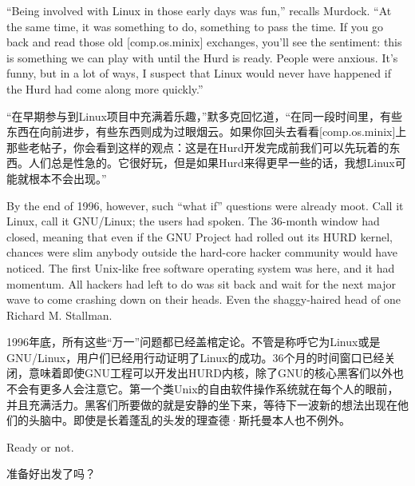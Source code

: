 \ifdefined\eng
``Being involved with Linux in those early days was fun,'' recalls Murdock. ``At the same time, it was something to do, something to pass the time. If you go back and read those old [comp.os.minix] exchanges, you'll see the sentiment: this is something we can play with until the Hurd is ready. People were anxious. It's funny, but in a lot of ways, I suspect that Linux would never have happened if the Hurd had come along more quickly.''
\fi

\ifdefined\chs
``在早期参与到Linux项目中充满着乐趣，''默多克回忆道，``在同一段时间里，有些东西在向前进步，有些东西则成为过眼烟云。如果你回头去看看[comp.os.minix]上那些老帖子，你会看到这样的观点：这是在Hurd开发完成前我们可以先玩着的东西。人们总是性急的。它很好玩，但是如果Hurd来得更早一些的话，我想Linux可能就根本不会出现。''
\fi

\ifdefined\eng
By the end of 1996, however, such ``what if'' questions were already moot. Call it Linux, call it GNU/Linux; the users had spoken. The 36-month window had closed, meaning that even if the GNU Project had rolled out its HURD kernel, chances were slim anybody outside the hard-core hacker community would have noticed. The first Unix-like free software operating system was here, and it had momentum. All hackers had left to do was sit back and wait for the next major wave to come crashing down on their heads. Even the shaggy-haired head of one Richard M. Stallman.
\fi

\ifdefined\chs
1996年底，所有这些``万一''问题都已经盖棺定论。不管是称呼它为Linux或是GNU/Linux，用户们已经用行动证明了Linux的成功。36个月的时间窗口已经关闭，意味着即使GNU工程可以开发出HURD内核，除了GNU的核心黑客们以外也不会有更多人会注意它。第一个类Unix的自由软件操作系统就在每个人的眼前，并且充满活力。黑客们所要做的就是安静的坐下来，等待下一波新的想法出现在他们的头脑中。即使是长着蓬乱的头发的理查德·斯托曼本人也不例外。
\fi

\ifdefined\eng
Ready or not.
\fi

\ifdefined\chs
准备好出发了吗？
\fi

\theendnotes
\setcounter{endnote}{0}
